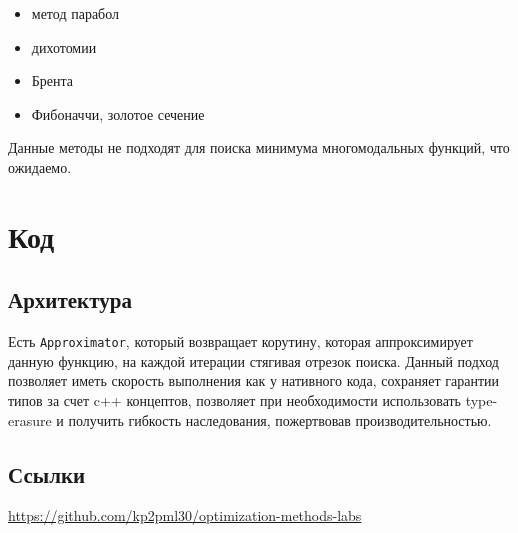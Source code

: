 \documentclass[russian, english]{article}
\def\code#1{\texttt{#1}}
\begin{document}
\begin{itemize}
	\item[\raisebox{.5pt}{\textcircled{\raisebox{-.9pt} {1}}}] метод парабол
	\item[\raisebox{.5pt}{\textcircled{\raisebox{-.9pt} {2}}}] дихотомии
	\item[\raisebox{.5pt}{\textcircled{\raisebox{-.9pt} {4}}}] Брента
	\item[\raisebox{.5pt}{\textcircled{\raisebox{-.9pt} {5}}}] Фибоначчи, золотое сечение
\end{itemize}
\par
Данные методы не подходят для поиска минимума многомодальных функций, что ожидаемо.

\newpage
\appendix
\section{Код}
\subsection{Архитектура}
Есть \code{Approximator}, который возвращает корутину, которая аппроксимирует данную функцию, на каждой итерации стягивая отрезок поиска. Данный подход позволяет иметь скорость выполнения как у нативного кода, сохраняет гарантии типов за счет c++ концептов, позволяет при необходимости использовать type-erasure и получить гибкость наследования, пожертвовав производительностью.

\subsection{Ссылки}
\url{https://github.com/kp2pml30/optimization-methods-labs}
\end{document}
